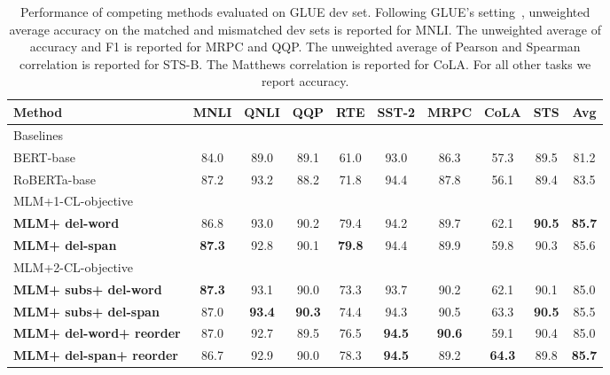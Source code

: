 \documentclass[11pt,a4paper]{article}
\begin{document}
\begin{table*}[t]
\caption{Performance of competing methods evaluated on GLUE dev set. Following GLUE's setting~\cite{wang2018glue}, unweighted average accuracy on the matched and mismatched dev sets is reported for MNLI. The unweighted average of accuracy and F1 is reported for MRPC and QQP. The unweighted average of Pearson and Spearman correlation is reported for STS-B. The Matthews correlation is reported for CoLA. For all other tasks we report accuracy.} 
\label{tab:large-glue}
\centering
\setlength{\tabcolsep}{8pt}
\renewcommand{\arraystretch}{1.2}
\begin{adjustbox}{max width=\textwidth}
\begin{tabular}{l c c c c c c c c c}  \toprule
Method & MNLI & QNLI & QQP & RTE & SST-2 & MRPC & CoLA & STS & Avg \\
\midrule
Baselines & & & & & & & & & \\
BERT-base~\cite{devlin2019bert} & 84.0 & 89.0 & 89.1 & 61.0 & 93.0 & 86.3 & 57.3 & 89.5 & 81.2\\
RoBERTa-base~\cite{liu2019roberta} & 87.2 & 93.2 & 88.2 & 71.8 & 94.4 & 87.8 & 56.1 & 89.4 & 83.5 \\
\midrule
MLM+1-CL-objective & & & & & & & & & \\
\textbf{MLM+ del-word} & 86.8 & 93.0 & 90.2 & 79.4 & 94.2 & 89.7  & 62.1 & \textbf{90.5} & \textbf{85.7}\\
\textbf{MLM+ del-span} & \textbf{87.3} & 92.8 & 90.1 & \textbf{79.8} & 94.4 & 89.9 & 59.8 & 90.3 & 85.6\\
\midrule
MLM+2-CL-objective & & & & & & & & & \\
\textbf{MLM+ subs+ del-word} & \textbf{87.3} & 93.1 & 90.0 & 73.3 & 93.7 & 90.2 & 62.1 & 90.1 & 85.0\\
\textbf{MLM+ subs+ del-span} & 87.0 & \textbf{93.4} & \textbf{90.3} & 74.4  & 94.3 & 90.5 & 63.3 & \textbf{90.5} & 85.5\\
\textbf{MLM+ del-word+ reorder} & 87.0 & 92.7 & 89.5 & 76.5 & \textbf{94.5} & \textbf{90.6} & 59.1 & 90.4 & 85.0\\
\textbf{MLM+ del-span+ reorder} & 86.7 & 92.9 & 90.0 & 78.3 & \textbf{94.5} & 89.2 & \textbf{64.3} & 89.8 & \textbf{85.7}\\

\bottomrule
\end{tabular}

\end{adjustbox}
\end{table*}
\end{document}
